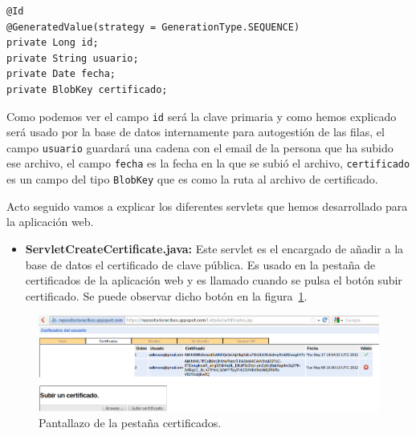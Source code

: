 \begin{itemize}
\begin{lstlisting}[style=Java]
@Id
@GeneratedValue(strategy = GenerationType.SEQUENCE)
private Long id;
private String usuario;
private Date fecha;
private BlobKey certificado;
\end{lstlisting}

Como podemos ver el campo \lstinline{id} será la clave primaria y como hemos explicado será usado por la base de datos internamente para autogestión de las filas, el campo \lstinline{usuario} guardará una cadena con el email de la persona que ha subido ese archivo, el campo \lstinline{fecha} es la fecha en la que se subió el archivo, \lstinline{certificado} es un campo del tipo \lstinline{BlobKey} que es como la ruta al archivo de certificado.

\end{itemize}

Acto seguido vamos a explicar los diferentes servlets que hemos desarrollado para la aplicación web.

\begin{itemize}

\item \textbf{ServletCreateCertificate.java:} Este servlet es el encargado de añadir a la base de datos el certificado de clave pública. Es usado en la pestaña de certificados de la aplicación web y es llamado cuando se pulsa el botón subir certificado. Se puede observar dicho botón en la figura~\ref{fig:pestanhaCertificados}.

\end{itemize}

\begin{figure}[h]
  \centering
    \includegraphics[scale=0.5]{./GoogleAppEngine/imagenes/certificadosRepositorioGeneral.png}
  \caption{Pantallazo de la pestaña certificados.}
  \label{fig:pestanhaCertificados}
\end{figure}

